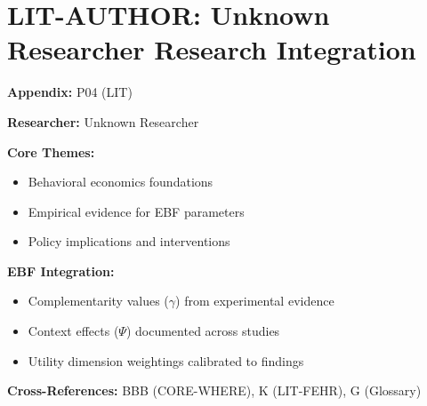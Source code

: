 %
%

\chapter{LIT-AUTHOR: Unknown Researcher Research Integration}
\label{app:p04}

\begin{abstract}
This appendix integrates the research contributions of Unknown Researcher into the
Evidence-Based Framework. It documents key papers, core findings, and their
integration with EBF dimensions including complementarity parameters ($\gamma$),
context factors ($\Psi$), and utility dimensions.
\end{abstract}

\begin{tcolorbox}[colback=blue!5!white, colframe=blue!75!black,
    title=Quick Reference: Unknown Researcher Research]

\textbf{Appendix:} P04 (LIT)

\textbf{Researcher:} Unknown Researcher

\textbf{Core Themes:}
\begin{itemize}[nosep]
\item Behavioral economics foundations
\item Empirical evidence for EBF parameters
\item Policy implications and interventions
\end{itemize}

\textbf{EBF Integration:}
\begin{itemize}[nosep]
\item Complementarity values ($\gamma$) from experimental evidence
\item Context effects ($\Psi$) documented across studies
\item Utility dimension weightings calibrated to findings
\end{itemize}

\textbf{Cross-References:} BBB (CORE-WHERE), K (LIT-FEHR), G (Glossary)
\end{tcolorbox}


